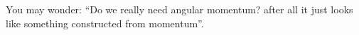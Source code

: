 \documentclass[a4paper,12pt,%
onecolumn,oneside,titlepage,%
british%
]{memoir}
\renewcommand*{\|}[1][]{\nonscript\:#1\vert\nonscript\:\mathopen{}}
\begin{document}
You may wonder:
\enquote{Do we really need angular momentum? after all it just looks like something constructed from momentum}.
\end{document}
